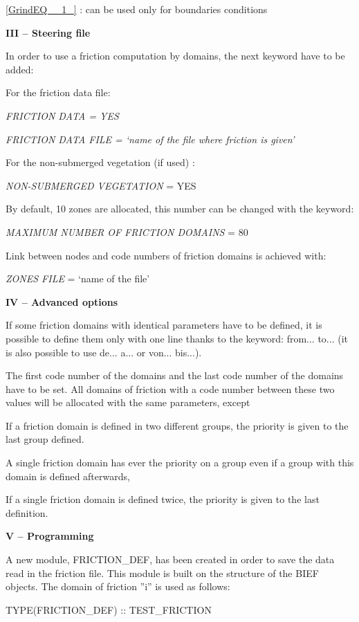 \eqref{GrindEQ__1_} : can be used only for boundaries conditions

 \textbf{}

 \textbf{ III -- Steering file}

 In order to use a friction computation by domains, the next keyword have to be added:

 For the friction data file:

 \textit{FRICTION DATA = YES}

 \textit{FRICTION DATA FILE = `name of the file where friction is given'}

 For the non-submerged vegetation (if used) :

 \textit{NON-SUBMERGED VEGETATION} = YES

 By default, 10 zones are allocated, this number can be changed with the keyword:

 \textit{MAXIMUM NUMBER OF FRICTION DOMAINS} = 80

 Link between nodes and code numbers of friction domains is achieved with:

 \textit{ZONES FILE} = `name of the file'

 \textbf{IV -- Advanced options}

 If some friction domains with identical parameters have to be defined, it is possible to define them only with one line thanks to the keyword: from... to... (it is also possible to use de... a... or von... bis...).

 The first code number of the domains and the last code number of the domains have to be set. All domains of friction with a code number between these two values will be allocated with the same parameters, except

 If a friction domain is defined in two different groups, the priority is given to the last group defined.

 A single friction domain has ever the priority on a group even if a group with this domain is defined afterwards,

 If a single friction domain is defined twice, the priority is given to the last definition.

 \textbf{ V -- Programming}

 A new module, FRICTION\_DEF, has been created in order to save the data read in the friction file. This module is built on the structure of the BIEF objects. The domain of friction ''i'' is used as follows:

 TYPE(FRICTION\_DEF) :: TEST\_FRICTION

